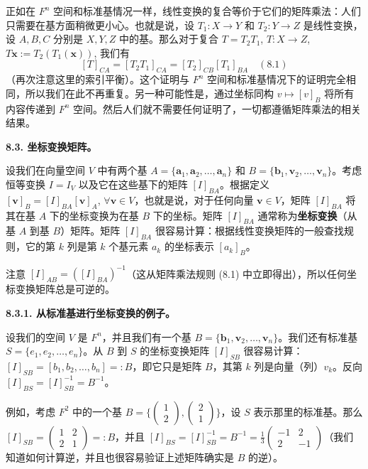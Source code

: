 正如在 $F^n$ 空间和标准基情况一样，线性变换的复合等价于它们的矩阵乘法：人们只需要在基方面稍微更小心。也就是说，设 $T_1: X \to Y$ 和 $T_2: Y \to Z$ 是线性变换，设 $A, B, C$ 分别是 $X, Y, Z$ 中的基。那么对于复合 $T = T_2 T_1$, $T: X \to Z$, $T \mathbf{x} := T_2(T_1(\mathbf{x}))$, 我们有
$$
[T]_{CA} = [T_2 T_1]_{CA} = [T_2]_{CB} [T_1]_{BA} \quad (8.1)
$$
（再次注意这里的索引平衡）。这个证明与 $F^n$ 空间和标准基情况下的证明完全相同，所以我们在此不再重复。另一种可能性是，通过坐标同构 $v \mapsto [v]_B$ 将所有内容传递到 $F^n$ 空间。然后人们就不需要任何证明了，一切都遵循矩阵乘法的相关结果。

\textbf{8.3. 坐标变换矩阵。}

设我们在向量空间 $V$ 中有两个基 $A = \{\mathbf{a}_1, \mathbf{a}_2, \dots, \mathbf{a}_n\}$ 和 $B = \{\mathbf{b}_1, \mathbf{v}_2, \dots, \mathbf{v}_n\}$。考虑恒等变换 $I = I_V$ 以及它在这些基下的矩阵 $[I]_{BA}$。根据定义 $[ \mathbf{v} ]_B = [I]_{BA} [\mathbf{v}]_A$, $\forall \mathbf{v} \in V$，也就是说，对于任何向量 $\mathbf{v} \in V$，矩阵 $[I]_{BA}$ 将其在基 $A$ 下的坐标变换为在基 $B$ 下的坐标。矩阵 $[I]_{BA}$ 通常称为\textbf{坐标变换}（从基 $A$ 到基 $B$）矩阵。矩阵 $[I]_{BA}$ 很容易计算：根据线性变换矩阵的一般查找规则，它的第 $k$ 列是第 $k$ 个基元素 $a_k$ 的坐标表示 $[a_k]_B$。

注意 $[I]_{AB} = ([I]_{BA})^{-1}$（这从矩阵乘法规则 (8.1) 中立即得出），所以任何坐标变换矩阵总是可逆的。

\textbf{8.3.1. 从标准基进行坐标变换的例子。}

设我们的空间 $V$ 是 $F^n$，并且我们有一个基 $B = \{\mathbf{b}_1, \mathbf{v}_2, \dots, \mathbf{v}_n\}$。我们还有标准基 $S = \{e_1, e_2, \dots, e_n\}$。从 $B$ 到 $S$ 的坐标变换矩阵 $[I]_{SB}$ 很容易计算：$[I]_{SB} = [b_1, b_2, \dots, b_n] =: B$，即它只是矩阵 $B$，其第 $k$ 列是向量（列）$v_k$。反向 $[I]_{BS} = [I]_{SB}^{-1} = B^{-1}$。

例如，考虑 $F^2$ 中的一个基 $B = \{ \begin{pmatrix} 1 \\ 2 \end{pmatrix}, \begin{pmatrix} 2 \\ 1 \end{pmatrix} \}$，设 $S$ 表示那里的标准基。那么 $[I]_{SB} = \begin{pmatrix} 1 & 2 \\ 2 & 1 \end{pmatrix} =: B$，并且 $[I]_{BS} = [I]_{SB}^{-1} = B^{-1} = \frac{1}{3} \begin{pmatrix} -1 & 2 \\ 2 & -1 \end{pmatrix}$（我们知道如何计算逆，并且也很容易验证上述矩阵确实是 $B$ 的逆）。

